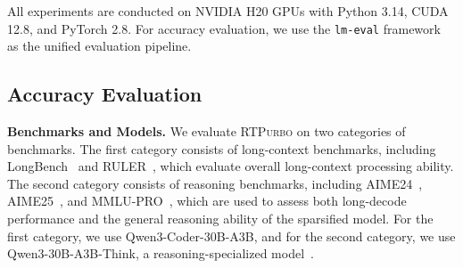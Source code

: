 \documentclass{llmxive}
\providecommand{\name}{{\textsc{RTPurbo}}\xspace}
\providecommand{\yy}[1]{\textbf{[YY: #1]}}
\begin{document}
All experiments are conducted on NVIDIA H20 GPUs with Python 3.14, CUDA 12.8, and PyTorch 2.8. For accuracy evaluation, we use the \texttt{lm-eval} framework~\citep{eval-harness} as the unified evaluation pipeline. 

\subsection{Accuracy Evaluation}
\label{sec:accuracy_eval}

\noindent\textbf{Benchmarks and Models.} We evaluate \name on two categories of benchmarks. The first category consists of long-context benchmarks, including LongBench~\citep{bai-etal-2024-longbench} and RULER~\citep{hsieh2024ruler}, which evaluate overall long-context processing ability. The second category consists of reasoning benchmarks, including AIME24~\citep{AIME24}, AIME25~\citep{AIME25}, and MMLU-PRO~\citep{mmlupro}, which are used to assess both long-decode performance and the general reasoning ability of the sparsified model. For the first category, we use Qwen3-Coder-30B-A3B, and for the second category, we use Qwen3-30B-A3B-Think, a reasoning-specialized model~\citep{qwen3}.
\end{document}
